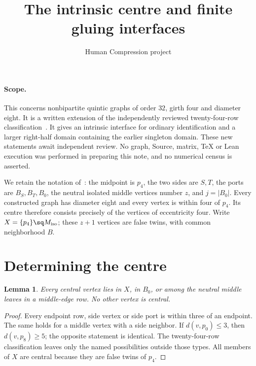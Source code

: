 \documentclass[11pt]{article}
\title{The intrinsic centre and finite gluing interfaces}
\author{Human Compression project}
\date{}
\newtheorem{lemma}[theorem]{Lemma}
\begin{document}
\maketitle

\paragraph{Scope.}
This concerns nonbipartite quintic graphs of order $32$, girth four and
diameter eight. It is a written extension of the independently reviewed
twenty-four-row classification~\cite{rows}. It gives an intrinsic interface for ordinary
identification and a larger right-half domain containing the earlier
singleton domain. These new statements await independent review.
No graph, Source, matrix, TeX or Lean execution was performed in preparing
this note, and no numerical census is asserted.

We retain the notation of~\cite{rows}: the midpoint is $p_4$, the two
sides are $S,T$, the ports are $B_S,B_T,B_0$, the neutral isolated middle
vertices number $z$, and $j=|B_0|$. Every constructed graph has diameter
eight and every vertex is within four of $p_4$. Its centre therefore
consists precisely of the vertices of eccentricity four. Write
$X=\{p_4\}\sq M_{\rm iso}$; these $z+1$ vertices are false twins, with
common neighborhood $B$.

\section{Determining the centre}

\begin{lemma}\label{restrict}
Every central vertex lies in $X$, in $B_0$, or among the neutral middle
leaves in a middle-edge row. No other vertex is central.
\end{lemma}
\begin{proof}
Every endpoint row, side vertex or side port is within three of an
endpoint. The same holds for a middle vertex with a side neighbor.
If $d(v,p_0)\leq3$, then $d(v,p_8)\geq5$; the opposite statement is
identical. The twenty-four-row classification leaves only the named
possibilities outside those types. All members of $X$ are central
because they are false twins of $p_4$.
\end{proof}
\end{document}

